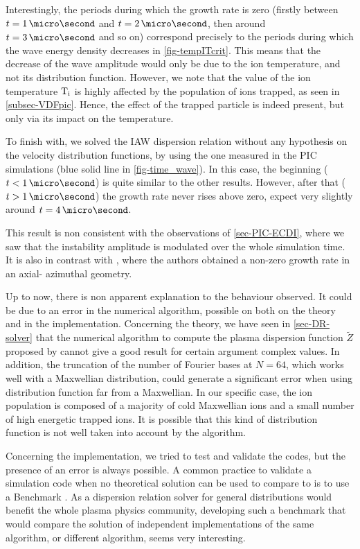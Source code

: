   Interestingly, the periods during which the growth rate is zero (firstly between $t=1\,\micro\second$ and $t=2\,\micro\second$, then around $t=3\,\micro\second$ and so on) correspond precisely to the periods during which the wave energy density decreases in \vref{fig-tempITcrit}.
  This means that the decrease of the wave amplitude would only be due to the ion temperature, and not its distribution function.
  However, we note that the value of the ion temperature $\mathrm{T_i}$ is highly affected by the population of ions trapped, as seen in \cref{subsec-VDFpic}.
  Hence, the effect of the trapped particle is indeed present, but only via its impact on the temperature.
  
  \vspace{1em}
  To finish with, we solved the \ac{IAW} dispersion relation without any hypothesis on the velocity distribution functions, by using the one measured in the PIC simulations (blue solid line in  \cref{fig-time_wave}).
  In this case, the beginning ($t < 1 \,\micro\second$) is quite similar to the other results.
  However, after that ($t > 1 \,\micro\second$) the growth rate never rises above zero, expect very slightly around $t=4\,\micro\second$.
  
  This result is non consistent with the observations of \cref{sec-PIC-ECDI}, where we saw that the instability amplitude is modulated over the whole simulation time.
  It is also in contrast with \citet{lafleur2018}, where the authors obtained a non-zero growth rate in an axial- azimuthal geometry.
  
  Up to now, there is non apparent explanation to the behaviour observed.
  It could be due to an error in the numerical algorithm, possible on both on the theory and in the implementation.
  Concerning the theory, we have seen in \cref{sec-DR-solver} that the numerical algorithm to compute the plasma dispersion function $\tilde{Z}$ proposed by \citet{xie2013} cannot give a good result for certain argument complex values.
  In addition, the truncation of the number of Fourier bases at $N=64$, which works well with a Maxwellian distribution, could generate a significant error when using distribution function far from a Maxwellian.
  In our specific case, the ion population is composed of a majority of cold Maxwellian ions and a small number of high energetic trapped ions.
  It is possible that this kind of distribution function is not well taken into account by the algorithm.
  
  Concerning the implementation, we tried to test and validate the codes, but the presence of an error is always possible.
  A common practice to validate a simulation code when no theoretical solution can be used to compare to is to use a Benchmark \citep{turner2013}.
  As a dispersion relation solver for general distributions would benefit the whole plasma physics community, developing such a benchmark that would compare the solution of independent implementations of the same algorithm, or different algorithm, seems very interesting.
  
